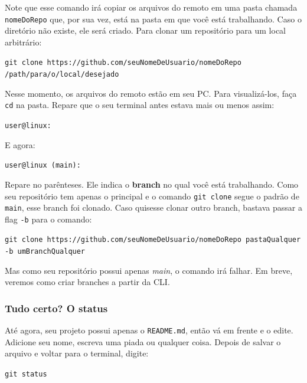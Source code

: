 \documentclass{article}
\begin{document}
  Note que esse comando irá copiar os arquivos do remoto em uma pasta chamada \texttt{nomeDoRepo} que, por sua vez, está na pasta
  em que você está trabalhando. Caso o diretório não existe, ele será criado. Para clonar um repositório para um local arbitrário: 

  \vspace{1ex}
  \texttt{git clone https://github.com/seuNomeDeUsuario/nomeDoRepo /path/para/o/local/desejado}
  \vspace{1ex}

  Nesse momento, os arquivos do remoto estão em seu PC. Para visualizá-los, faça \texttt{cd} na pasta. Repare que o seu terminal 
  antes estava mais ou menos assim:

  \vspace{1ex}
  \texttt{user@linux: ~}
  \vspace{1ex}

  E agora: 

  \vspace{1ex}
  \texttt{user@linux (main): ~}
  \vspace{1ex}

  Repare no parênteses. Ele indica o \textbf{branch} no qual você está trabalhando. Como seu repositório tem apenas o principal e o 
  comando \texttt{git clone} segue o padrão de \texttt{main}, esse branch foi clonado. Caso quisesse clonar outro branch, bastava
  passar a flag \texttt{-b} para o comando: 

  \vspace{1ex}
  \texttt{git clone https://github.com/seuNomeDeUsuario/nomeDoRepo pastaQualquer -b umBranchQualquer}
  \vspace{1ex}

  Mas como seu repositório possui apenas \textit{main}, o comando irá falhar. Em breve, veremos como criar branches a partir da CLI.

  \subsubsection{Tudo certo? O status}

  Até agora, seu projeto possui apenas o \texttt{README.md}, então vá em frente e o edite. Adicione seu nome, escreva uma piada ou 
  qualquer coisa. Depois de salvar o arquivo e voltar para o terminal, digite: 

  \vspace{1ex}
  \texttt{git status}
  \vspace{1ex}
\end{document}
